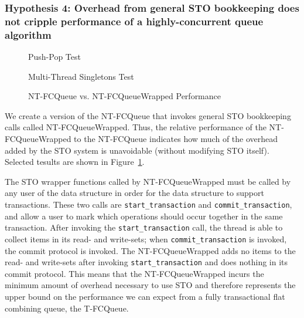 \vspace{12pt}
\noindent{}

\subsubsection{Hypothesis 4: Overhead from general STO bookkeeping does not cripple performance of a highly-concurrent queue algorithm}

\begin{figure}[H]
    \centering
	\begin{minipage}{0.75\textwidth}
        \caption*{Push-Pop Test}
        \vspace{12pt}
	\end{minipage}
   	\begin{minipage}{0.75\textwidth}
        \caption*{Multi-Thread Singletons Test}
	\end{minipage}
        \caption{NT-FCQueue vs. NT-FCQueueWrapped Performance}
    \label{fig:wrappedqs}
\end{figure}

We create a version of the NT-FCQueue that invokes general STO bookkeeping calls called NT-FCQueueWrapped. Thus, the relative performance of the NT-FCQueueWrapped to the NT-FCQueue indicates how much of the overhead added by the STO system is unavoidable (without modifying STO itself). 
Selected tesults are shown in Figure~\ref{fig:wrappedqs}.

The STO wrapper functions called by NT-FCQueueWrapped must be called by any user of the data structure in order for the data structure to support transactions.
These two calls are \texttt{start\_transaction} and \texttt{commit\_transaction}, and allow a user to mark which operations should occur together in the same transaction. After invoking the \texttt{start\_transaction} call, the thread is able to collect items in its read- and write-sets; when \texttt{commit\_transaction} is invoked, the commit protocol is invoked. The NT-FCQueueWrapped adds no items to the read- and write-sets after invoking \texttt{start\_transaction} and does nothing in its commit protocol. This means that the NT-FCQueueWrapped incurs the minimum amount of overhead necessary to use STO and therefore represents the upper bound on the performance we can expect from a fully transactional flat combining queue, the T-FCQueue. 

